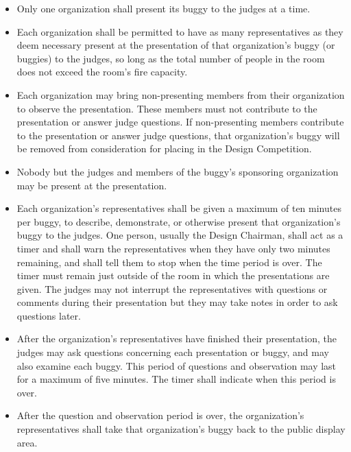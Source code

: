	\begin{itemize}

		\item
		Only one organization shall present its buggy to the judges at a time.

		\item
		Each organization shall be permitted to have as many representatives as they deem necessary present at the presentation of that organization's buggy (or buggies) to the judges, so long as the total number of people in the room does not exceed the room’s fire capacity.

        \item Each organization may bring non-presenting members from their organization to observe the presentation. These members must not contribute to the presentation or answer judge questions. If non-presenting members contribute to the presentation or answer judge questions, that organization’s buggy will be removed from consideration for placing in the Design Competition.

		\item
		Nobody but the judges and members of the buggy's sponsoring organization may be present at the presentation.

		\item
		Each organization's representatives shall be given a maximum of ten minutes per buggy, to describe, demonstrate, or otherwise present that organization's buggy to the judges. One person, usually the Design Chairman, shall act as a timer and shall warn the representatives when they have only two minutes remaining, and shall tell them to stop when the time period is over. The timer must remain just outside of the room in which the presentations are given. The judges may not interrupt the representatives with questions or comments during their presentation but they may take notes in order to ask questions later.

		\item
		After the organization's representatives have finished their presentation, the judges may ask questions concerning each presentation or buggy, and may also examine each buggy. This period of questions and observation may last for a maximum of five minutes. The timer shall indicate when this period is over.

		\item
		After the question and observation period is over, the organization's representatives shall take that organization's buggy back to the public display area.


	\end{itemize}


